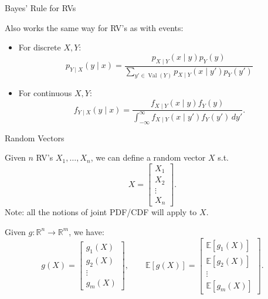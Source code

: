 \documentclass[aspectratio=169,12pt]{beamer}
\DeclareMathOperator{\Val}{Val}
\begin{document}
\begin{frame}[t]{Bayes' Rule for RVs}
  \vspace{0.08cm}
  {
  Also works the same way for RV's as with events:
  \begin{itemize}
    \setlength{\itemsep}{0.18cm}
    \item For discrete $X,Y$:
      \[
        p_{Y\mid X}(y\mid x)
        =\frac{p_{X\mid Y}(x\mid y)p_Y(y)}
        {\sum_{y'\in\Val(Y)}p_{X\mid Y}(x\mid y')p_Y(y')}
      \]
    \item For continuous $X,Y$:
      \[
        f_{Y\mid X}(y\mid x)
        =\frac{f_{X\mid Y}(x\mid y)f_Y(y)}
        {\int_{-\infty}^{\infty}f_{X\mid Y}(x\mid y')f_Y(y')\,dy'}.
      \]
  \end{itemize}
  }
\end{frame}

\begin{frame}[t]{Random Vectors}
  \vspace{-0.08cm}
  {
  Given $n$ RV's $X_1,\ldots,X_n$, we can define a random vector $X$ s.t.
  \[
    X=\begin{bmatrix}X_1\\X_2\\\vdots\\X_n\end{bmatrix}.
  \]
  Note: all the notions of joint PDF/CDF will apply to $X$.

  Given $g:\mathbb{R}^{n}\to\mathbb{R}^{m}$, we have:
  \[
    g(X)=\begin{bmatrix}g_1(X)\\g_2(X)\\\vdots\\g_m(X)\end{bmatrix},\qquad
    \mathbb{E}[g(X)]=
    \begin{bmatrix}
      \mathbb{E}[g_1(X)]\\
      \mathbb{E}[g_2(X)]\\
      \vdots\\
      \mathbb{E}[g_m(X)]
    \end{bmatrix}.
  \]
  }
\end{frame}
\end{document}
